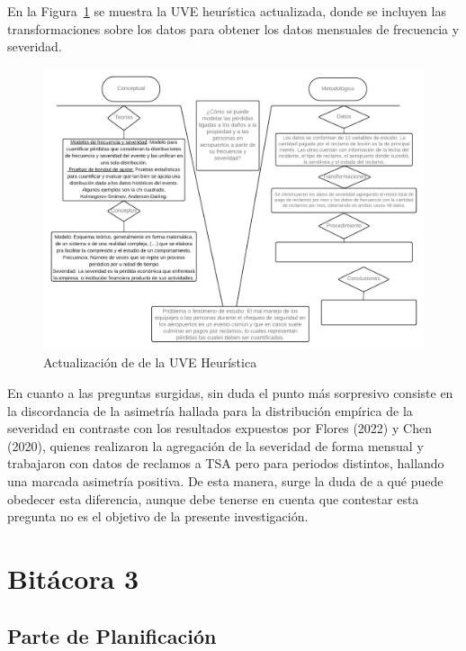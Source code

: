 \documentclass[
  letterpaper,
  onepage,
  openany]{scrreprt}
\begin{document}
En la Figura~\ref{fig-UVE2} se muestra la UVE heurística actualizada,
donde se incluyen las transformaciones sobre los datos para obtener los
datos mensuales de frecuencia y severidad.

\begin{figure}[H]

\caption{\label{fig-UVE2}Actualización de de la UVE Heurística}

{\centering \includegraphics[width=6.25in,height=\textheight]{./Images/UVE Maik 2.png}

}

\end{figure}

En cuanto a las preguntas surgidas, sin duda el punto más sorpresivo
consiste en la discordancia de la asimetría hallada para la distribución
empírica de la severidad en contraste con los resultados expuestos por
Flores (2022) y Chen (2020), quienes realizaron la agregación de la
severidad de forma mensual y trabajaron con datos de reclamos a TSA pero
para periodos distintos, hallando una marcada asimetría positiva. De
esta manera, surge la duda de a qué puede obedecer esta diferencia,
aunque debe tenerse en cuenta que contestar esta pregunta no es el
objetivo de la presente investigación.


\hypertarget{bituxe1cora-3}{%
\chapter{Bitácora 3}\label{bituxe1cora-3}}

\hypertarget{parte-de-planificaciuxf3n-1}{%
\section{Parte de Planificación}\label{parte-de-planificaciuxf3n-1}}
\end{document}
